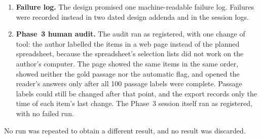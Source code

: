 \begin{enumerate}
\item \textbf{Failure log.} The design promised one machine-readable failure log. Failures were recorded instead in two dated design addenda and in the session logs.
\item \textbf{Phase~3 human audit.} The audit ran as registered, with one change of tool: the author labelled the items in a web page instead of the planned spreadsheet, because the spreadsheet's selection lists did not work on the author's computer. The page showed the same items in the same order, showed neither the gold passage nor the automatic flag, and opened the reader's answers only after all 100 passage labels were complete. Passage labels could still be changed after that point, and the export records only the time of each item's last change. The Phase~3 session itself ran as registered, with no failed run.
\end{enumerate}
No run was repeated to obtain a different result, and no result was discarded.
